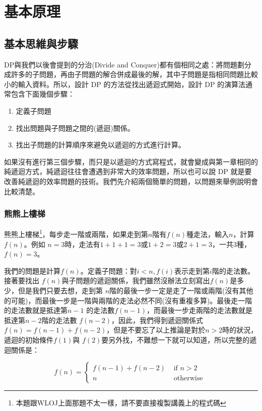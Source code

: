 \documentclass[a4paper, 11pt, oneside]{book}
\begin{document}
\section{基本原理}
\subsection{基本思維與步驟}
DP與我們以後會提到的分治(Divide and Conquer)都有個相同之處：將問題劃分成許多的子問題，再由子問題的解合併成最後的解，其中子問題是指相同問題比較小的輸入資料。所以，設計 DP 的方法從找出遞迴式開始，設計 DP 的演算法通常包含下面幾個步驟：

\begin{enumerate}
    \item 定義子問題
    \item 找出問題與子問題之間的(遞迴)關係。
    \item 找出子問題的計算順序來避免以遞迴的方式進行計算。
\end{enumerate}

如果沒有進行第三個步驟，而只是以遞迴的方式寫程式，就會變成與第一章相同的純遞迴方式，純遞迴往往會遭遇到非常大的效率問題，所以也可以說 DP 就是要改善純遞迴的效率問題的技術。我們先介紹兩個簡單的問題，以問題來舉例說明會比較清楚。

\subsubsection{熊熊上樓梯}
熊熊上樓梯\footnote{本題跟WLOJ上面那題不太一樣，請不要直接複製講義上的程式碼}，每步走一階或兩階，如果走到第$n$階有$f(n)$種走法，輸入$n$，計算$f(n)$。例如 $n=3$時，走法有$1+1+1=3$或$1+2=3$或$2+1=3$，一共$3$種，$f(n)=3$。


我們的問題是計算$f(n)$。定義子問題：對$i<n, f(i)$表示走到第$i$階的走法數。接著要找出 $f(n)$與子問題的遞迴關係，我們雖然沒辦法立刻寫出$f(n)$是多少，但是我們只要去想，走到第 $n$階的最後一步一定是走了一階或兩階(沒有其他的可能)，而最後一步是一階與兩階的走法必然不同(沒有重複多算)。最後走一階的走法數就是抵達第$n-1$ 的走法數$f(n-1)$，而最後一步走兩階的走法數就是抵達第$n-2$階的走法數 $f(n-2)$，因此，我們得到遞迴關係式$f(n)=f(n-1)+f(n-2)$，但是不要忘了以上推論是對於$n>2 $時的狀況，遞迴的初始條件$f(1)$與 $f(2)$要另外找，不難想一下就可以知道，所以完整的遞迴關係是：

\begin{equation}
    \label{eq:rec}
    f(n)=\left\{\begin{array}{ll}
        f(n-1)+f(n-2) & \text { if } n>2    \\
        n             & \text { otherwise }
    \end{array}\right.
\end{equation}
\end{document}
